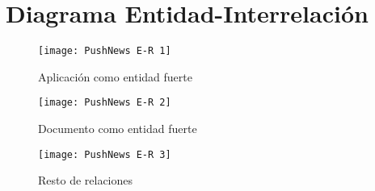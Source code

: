 \section{Diagrama Entidad-Interrelación}
\begin{figure}[h]
    \centering
    \texttt{[image: PushNews E-R 1]}
    \caption{Aplicación como entidad fuerte}
    \label{fig:diagram-entidad-interrelacion-1}
\end{figure}

\begin{figure}[h]
    \centering
    \texttt{[image: PushNews E-R 2]}
    \caption{Documento como entidad fuerte}
    \label{fig:diagram-entidad-interrelacion-2}
\end{figure}

\begin{figure}[h]
    \centering
    \texttt{[image: PushNews E-R 3]}
    \caption{Resto de relaciones}
    \label{fig:diagram-entidad-interrelacion-2}
\end{figure}